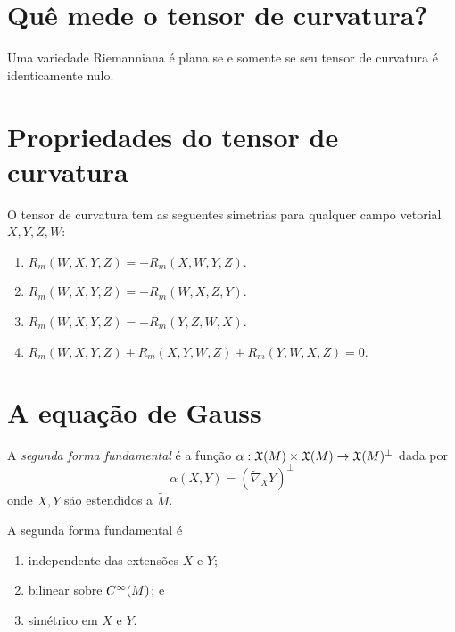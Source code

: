 \section{Quê mede o tensor de curvatura?}

\begin{teorema}
	Uma variedade Riemanniana é plana se e somente se seu tensor de curvatura é identicamente nulo.
\end{teorema}


\section{Propriedades do tensor de curvatura}

\begin{proposicao}\label{simetrias-del-tensor-de-curvatura}
	O tensor de curvatura tem as seguentes simetrias para qualquer campo vetorial $X,Y,Z,W$:
	\begin{enumerate}
		\item $R_m(W,X,Y,Z) = -R_m(X,W,Y,Z)$.
		\item $R_m(W,X,Y,Z) = -R_m(W,X,Z,Y)$.
		\item $R_m(W,X,Y,Z) = -R_m(Y,Z,W,X)$.
		\item $R_m(W,X,Y,Z) + R_m(X,Y,W,Z) + R_m(Y,W,X,Z) = 0$.
	\end{enumerate}
\end{proposicao}


\section{A equação de Gauss}

\begin{definicao}
	A \emph{segunda forma fundamental} é a função $\alpha: \mathfrak{X}(M) \times \mathfrak{X}(M) \rightarrow \mathfrak{X}(M)^\perp$ dada por
	\begin{equation*}
		\alpha(X,Y) = (\tilde{\nabla}_X Y)^\perp
	\end{equation*} 
	onde $X,Y$ são estendidos a $\tilde{M}$.
\end{definicao}

\begin{lema}
	A segunda forma fundamental é
	\begin{enumerate}
		\item independente das extensões $X$ e $Y$;
		\item bilinear sobre $C^\infty(M)$; e
		\item simétrico em $X$ e $Y$.
	\end{enumerate}
\end{lema}

